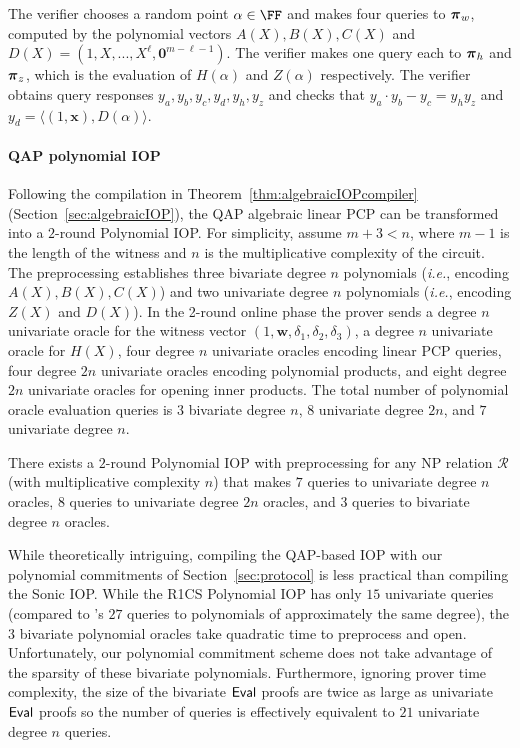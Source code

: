 The verifier chooses a random point $\alpha \in \FF$ and makes four queries to $\boldsymbol{\pi}_w$, computed by the polynomial vectors $A(X), B(X), C(X)$ and $D(X) = (1, X,...,X^\ell, \mathbf{0}^{m- \ell -1})$. The verifier makes one query each to $\boldsymbol{\pi}_h$ and $\boldsymbol{\pi}_z$, which is the evaluation of $H(\alpha)$ and $Z(\alpha)$ respectively. The verifier obtains query responses $y_a, y_b, y_c, y_d, y_h, y_z$ and checks that $y_a \cdot y_b - y_c = y_h y_z$ and $y_d = \langle (1, \mathbf{x}), D(\alpha) \rangle$. 

\paragraph{QAP polynomial IOP} 

Following the compilation in Theorem~\ref{thm:algebraicIOPcompiler} (Section~\ref{sec:algebraicIOP}), the QAP algebraic linear PCP can be transformed into a $2$-round Polynomial IOP. For simplicity, assume $m+3 < n$, where $m-1$ is the length of the witness and $n$ is the multiplicative complexity of the circuit. The preprocessing establishes three bivariate degree $n$ polynomials (\emph{i.e.}, encoding $A(X), B(X), C(X)$) and two univariate degree $n$ polynomials (\emph{i.e.}, encoding $Z(X)$ and $D(X)$). In the 2-round online phase the prover sends a degree $n$ univariate oracle for the witness vector $(1, \mathbf{w}, \delta_1, \delta_2, \delta_3)$, a degree $n$ univariate oracle for $H(X)$, four degree $n$ univariate oracles encoding linear PCP queries, four degree $2n$ univariate oracles encoding polynomial products, and eight degree $2n$ univariate oracles for opening inner products. The total number of polynomial oracle evaluation queries is $3$ bivariate degree $n$, $8$ univariate degree $2n$, and $7$ univariate degree $n$. 

\begin{theorem}
There exists a $2$-round Polynomial IOP with preprocessing for any NP relation $\mathcal{R}$ (with multiplicative complexity $n$) that makes $7$ queries to univariate degree $n$ oracles, $8$ queries to univariate degree $2n$ oracles, and $3$ queries to bivariate degree $n$ oracles.  
\end{theorem}
 
While theoretically intriguing, compiling the QAP-based IOP with our polynomial commitments of Section~\ref{sec:protocol} is less practical than compiling the \textsf{Sonic} IOP. While the R1CS Polynomial IOP has only $15$ univariate queries (compared to 's $27$ queries to polynomials of approximately the same degree), the $3$ bivariate polynomial oracles take quadratic time to preprocess and open. Unfortunately, our polynomial commitment scheme does not take advantage of the sparsity of these bivariate polynomials. Furthermore, ignoring prover time complexity, the size of the bivariate $\textsf{{Eval}}$ proofs are twice as large as univariate $\textsf{{Eval}}$ proofs so the number of queries is effectively equivalent to $21$ univariate degree $n$ queries. 